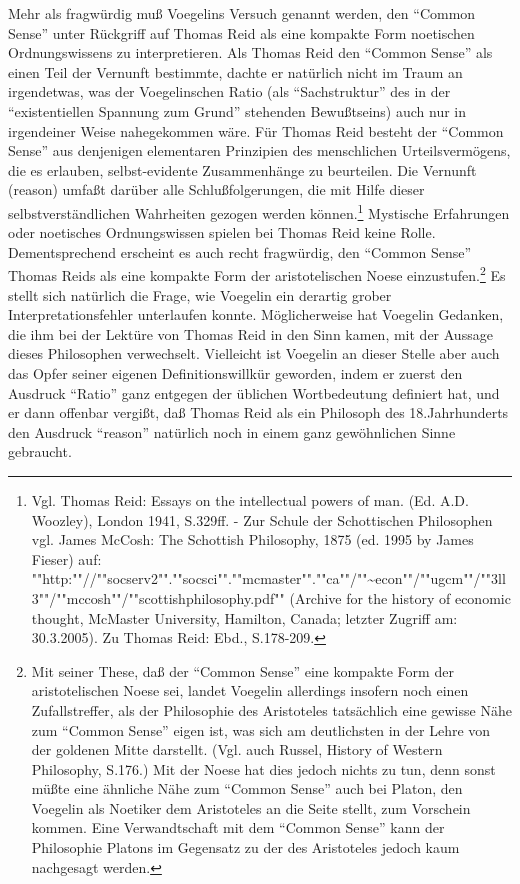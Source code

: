 Mehr als fragwürdig muß Voegelins Versuch genannt werden, den "`Common Sense"'
unter Rückgriff auf Thomas Reid als eine kompakte Form noetischen
Ordnungswissens zu interpretieren. Als Thomas Reid den "`Common Sense"' als
einen Teil der Vernunft bestimmte, dachte er natürlich nicht im Traum an
irgendetwas, was der Voegelinschen Ratio (als "`Sachstruktur"' des in der
"`existentiellen Spannung zum Grund"' stehenden Bewußtseins) auch nur in
irgendeiner Weise nahegekommen wäre.  Für Thomas Reid besteht der "`Common
Sense"' aus denjenigen elementaren Prinzipien des menschlichen
Urteilsvermögens, die es erlauben, selbst-evidente Zusammenhänge zu
beurteilen.  Die Vernunft (reason) umfaßt darüber alle Schlußfolgerungen, die
mit Hilfe dieser selbstverständlichen Wahrheiten gezogen werden
können.\footnote{Vgl.  Thomas Reid: Essays on the intellectual powers of man.
  (Ed. A.D.  Wooz\-ley), London 1941, S.329ff. - Zur Schule der Schottischen
  Philosophen vgl. James Mc\-Cosh: The Schottish Philosophy, 1875 (ed.  1995
  by James Fieser) auf: ""http:""//""socserv2"".""socsci"".""mcmaster"".""ca""/""\~{ }econ""/""ugcm""/""3ll3""/""mccosh""/""scottishphilosophy.pdf"" 
  (Archive for the history of
  economic thought, McMaster University, Hamilton, Canada; letzter Zugriff am:
  30.3.2005).  Zu Thomas Reid: Ebd., S.178-209.}  Mystische Erfahrungen oder
noetisches Ordnungswissen spielen bei Thomas Reid keine Rolle. Dementsprechend
erscheint es auch recht fragwürdig, den "`Common Sense"' Thomas Reids als eine
kompakte Form der aristotelischen Noese einzustufen.\footnote{Mit seiner
  These, daß der "`Common Sense"' eine kompakte Form der aristotelischen Noese
  sei, landet Voegelin allerdings insofern noch einen Zufallstreffer, als der
  Philosophie des Aristoteles tatsächlich eine gewisse Nähe zum "`Common
  Sense"' eigen ist, was sich am deutlichsten in der Lehre von der goldenen
  Mitte darstellt.  (Vgl. auch Russel, History of Western Philosophy, S.176.)
  Mit der Noese hat dies jedoch nichts zu tun, denn sonst müßte eine ähnliche
  Nähe zum "`Common Sense"' auch bei Platon, den Voegelin als Noetiker dem
  Aristoteles an die Seite stellt, zum Vorschein kommen.  Eine Verwandtschaft
  mit dem "`Common Sense"' kann der Philosophie Platons im Gegensatz zu der
  des Aristoteles jedoch kaum nachgesagt werden.}  Es stellt sich natürlich
die Frage, wie Voegelin ein derartig grober Interpretationsfehler unterlaufen
konnte.  Möglicherweise hat Voegelin Gedanken, die ihm bei der Lektüre von
Thomas Reid in den Sinn kamen, mit der Aussage dieses Philosophen verwechselt.
Vielleicht ist Voegelin an dieser Stelle aber auch das Opfer seiner eigenen
Definitionswillkür geworden, indem er zuerst den Ausdruck "`Ratio"' ganz
entgegen der üblichen Wortbedeutung definiert hat, und er dann offenbar
vergißt, daß Thomas Reid als ein Philosoph des 18.Jahrhunderts den Ausdruck
"`reason"' natürlich noch in einem ganz gewöhnlichen Sinne gebraucht.

